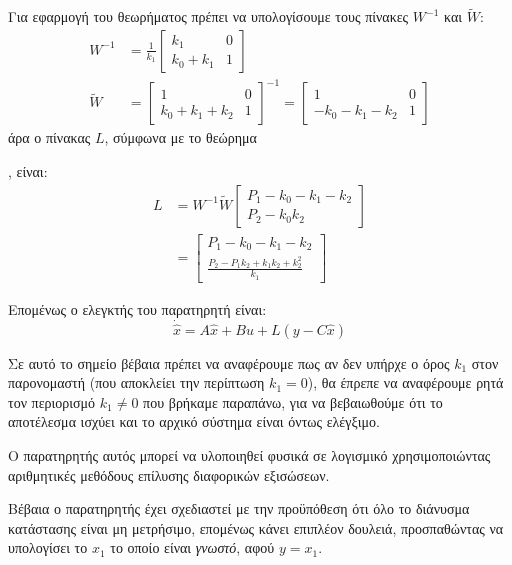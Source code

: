 \documentclass[11pt,a4paper,notitlepage,fleqn]{article}
\let\mytodo\todo
\renewcommand{\todo}[1]{\par\mytodo[inline,noline]{#1}}
\begin{document}
\begin{exercise}
	Για εφαρμογή του θεωρήματος πρέπει να υπολογίσουμε τους πίνακες
	\( W^{-1} \) και \( \tilde W \):
	\begin{align*}
		W^{-1} &= \frac{1}{k_1} \left[\begin{matrix}
		k_1 & 0 \\ k_0 + k_1 & 1
		\end{matrix}\right]
		\\
		\tilde W &= \left[\begin{matrix}
		1 & 0 \\ k_0+k_1+k_2 & 1
		\end{matrix}\right]^{-1} = \left[\begin{matrix}
		1 & 0 \\ -k_0-k_1-k_2 & 1
		\end{matrix}\right]
	\end{align*}
	άρα ο πίνακας \( L \), σύμφωνα με το θεώρημα \todo{τάδε}, είναι:
	\begin{align*}
	L &= W^{-1} \tilde W \left[\begin{matrix}
	P_1 - k_0 - k_1 - k_2 \\ P_2 - k_0 k_2
	\end{matrix}\right]
	\\ &= \left[\begin{matrix}
	P_1 - k_0 - k_1 - k_2 \\
	\frac{P_2 - P_1k_2 + k_1k_2 + k_2^2}{k_1}
	\end{matrix}\right]
	\end{align*}

	Επομένως ο ελεγκτής του παρατηρητή είναι:
	\[
	\dot{\hat{x}} = A\hat x + Bu + L(y-C\hat x)
	\]

	Σε αυτό το σημείο βέβαια πρέπει να αναφέρουμε πως αν δεν υπήρχε ο
	όρος \( k_1 \) στον παρονομαστή (που αποκλείει την περίπτωση
	\( k_1 = 0 \)), θα έπρεπε να αναφέρουμε ρητά τον περιορισμό
	\( k_1 \neq 0 \) που βρήκαμε παραπάνω, για να βεβαιωθούμε ότι το
	αποτέλεσμα ισχύει και το αρχικό σύστημα είναι όντως ελέγξιμο.

	Ο παρατηρητής αυτός μπορεί να υλοποιηθεί φυσικά σε λογισμικό χρησιμοποιώντας
	αριθμητικές μεθόδους επίλυσης διαφορικών εξισώσεων.

	Βέβαια ο παρατηρητής έχει σχεδιαστεί με την προϋπόθεση ότι όλο
	το διάνυσμα κατάστασης είναι μη μετρήσιμο, επομένως κάνει επιπλέον
	δουλειά, προσπαθώντας να υπολογίσει το \( x_1 \) το οποίο είναι
	\textit{γνωστό}, αφού \( y = x_1 \).
\end{exercise}
\end{document}
